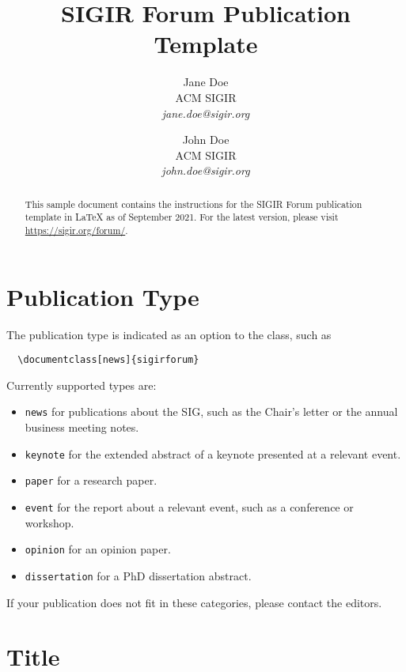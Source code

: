 \documentclass[news]{sigirforum}
\begin{document}
\title{SIGIR Forum Publication Template}

\author{
Jane Doe\\ACM SIGIR\\\emph{jane.doe@sigir.org}
\and
John Doe\\ACM SIGIR\\\emph{john.doe@sigir.org}
}

\maketitle 
\begin{abstract}
This sample document contains the instructions for the SIGIR Forum publication template in \LaTeX\xspace as of September 2021. For the latest version, please visit \url{https://sigir.org/forum/}. 
\end{abstract}

\section{Publication Type}

The publication type is indicated as an option to the class, such as
\begin{verbatim}
  \documentclass[news]{sigirforum}
\end{verbatim}
Currently supported types are:
\begin{itemize}
	\item \texttt{news} for publications about the SIG, such as the Chair's letter or the annual business meeting notes.
	\item \texttt{keynote} for the extended abstract of a keynote presented at a relevant event.
	\item \texttt{paper} for a research paper.
	\item \texttt{event} for the report about a relevant event, such as a conference or workshop.
	\item \texttt{opinion} for an opinion paper.
	\item \texttt{dissertation} for a PhD dissertation abstract.
\end{itemize}

If your publication does not fit in these categories, please contact the editors.

\section{Title}
\end{document}
